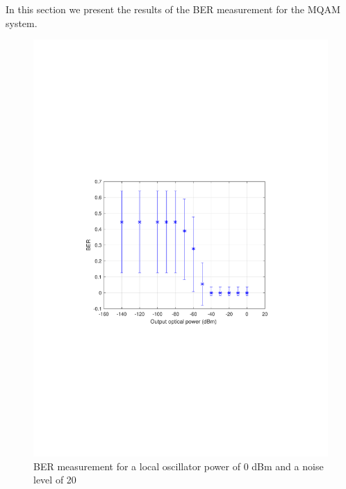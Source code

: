 In this section we present the results of the BER measurement for the MQAM system.

\begin{figure}
	\centering
	\includegraphics[width=\textwidth]{./figures/BER_LO0_Noise20}
	\caption{BER measurement for a local oscillator power of 0 dBm and a noise level of 20}\label{fig:BER20}
\end{figure}

